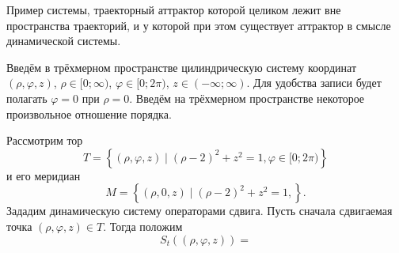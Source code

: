 
\LARGE



Пример системы, траекторный аттрактор которой целиком лежит вне пространства траекторий,
и у которой при этом существует аттрактор в смысле динамической системы.

Введём в трёхмерном пространстве цилиндрическую систему координат
$(\rho, \varphi, z)$, $\rho \in [0; \infty)$, $\varphi \in [0; 2\pi)$, $z \in (-\infty; \infty)$.
Для удобства записи будет полагать $\varphi = 0$ при $\rho = 0$.
Введём на трёхмерном пространстве некоторое произвольное отношение порядка.

Рассмотрим тор
$$
	T=\left\{
		(\rho, \varphi, z)
	\mid
		(\rho-2)^2 + z^2 = 1,
		\varphi \in [0; 2\pi)
	\right\}
$$
и его меридиан
$$
	M=\left\{
		(\rho, 0, z)
	\mid
		(\rho-2)^2 + z^2 = 1,
	\right\}.
$$
Зададим динамическую систему
операторами сдвига.
Пусть сначала сдвигаемая точка $(\rho, \varphi, z) \in T$.
Тогда положим
\begin{equation}\label{opsdviga_tor_in}
	S_t((\rho, \varphi, z)) =

\end{equation}





